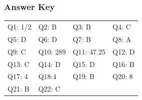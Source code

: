 \documentclass[12pt]{article}
\begin{document}
\subsubsection*{Answer Key}
\begin{tabularx}{\textwidth}{@{}llll@{}}
\toprule
Q1: 1/2 & Q2: B & Q3: B & Q4: C \\
Q5: D & Q6: D & Q7: B & Q8: A \\
Q9: C & Q10: 289 & Q11: 47.25 & Q12: D \\
Q13: C & Q14: D & Q15: D & Q16: B \\
Q17: 4 & Q18:4  & Q19: B & Q20: 8 \\
Q21: B & Q22: C & & \\
\bottomrule
\end{tabularx}
\end{document}
